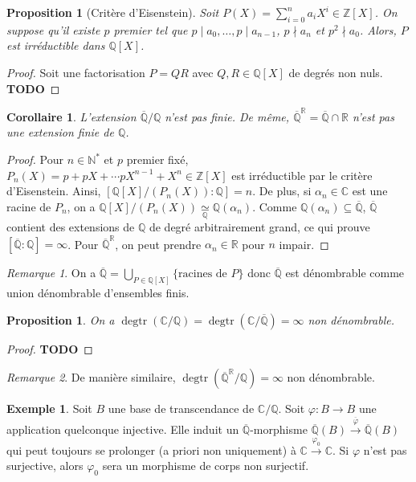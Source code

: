 \documentclass{article}
\newcommand{\N}{\mathbb{N}}
\newcommand{\Z}{\mathbb{Z}}
\newcommand{\Q}{\mathbb{Q}}
\newcommand{\Qbar}{\overline{\mathbb{Q}}}
\newcommand{\R}{\mathbb{R}}
\newcommand{\C}{\mathbb{C}}
\DeclareMathOperator{\degtr}{degtr}
\newcommand{\todo}{\textbf{TODO}}
\theoremstyle{plain}
\newtheorem{proposition}[theorem]{Proposition}
\newtheorem{corollary}[theorem]{Corollaire}
\theoremstyle{definition}
\newtheorem{example}[theorem]{Exemple}
\theoremstyle{remark}
\newtheorem*{remark}{Remarque}
\begin{document}
\begin{proposition}[Critère d'Eisenstein]
    Soit $P(X) = \sum\limits_{i=0}^n a_i X^i \in \Z[X]$. On suppose qu'il existe $p$ premier tel que $p \mid a_0,\dots,p\mid a_{n-1}$, $p \nmid a_n$ et $p^2 \nmid a_0$. Alors, $P$ est irréductible dans $\Q[X]$.
\end{proposition}

\begin{proof}
    Soit une factorisation $P = QR$ avec $Q,R \in \Q[X]$ de degrés non nuls. \todo
\end{proof}

\begin{corollary}
    L'extension $\overline{\Q}/\Q$ n'est pas finie. De même, $\overline{\Q}^\R = \overline{\Q} \cap \R$ n'est pas une extension finie de $\Q$.
\end{corollary}

\begin{proof}
    Pour $n \in \N^*$ et $p$ premier fixé, $P_n(X) = p + pX + \cdots pX^{n-1} + X^n \in \Z[X]$ est irréductible par le critère d'Eisenstein. Ainsi, $[\Q[X]/(P_n(X)) : \Q] = n$. De plus, si $\alpha_n \in \C$ est une racine de $P_n$, on a $\Q[X]/(P_n(X)) \underset{\Q}{\simeq} \Q(\alpha_n)$. Comme $\Q(\alpha_n) \subseteq \Qbar$, $\Qbar$ contient des extensions de $\Q$ de degré arbitrairement grand, ce qui prouve $[\Qbar : \Q] = \infty$. Pour $\Qbar^\R$, on peut prendre $\alpha_n \in \R$ pour $n$ impair.
\end{proof}

\begin{remark}
    On a $\Qbar = \bigcup_{P \in \Q[X]} \{\text{racines de } P\}$ donc $\Qbar$ est dénombrable comme union dénombrable d'ensembles finis.
\end{remark}

\begin{proposition}
    On a $\degtr(\C/\Q) = \degtr(\C/\Qbar) = \infty$ non dénombrable.
\end{proposition}

\begin{proof}
    \todo
\end{proof}

\begin{remark}
    De manière similaire, $\degtr(\Qbar^\R/\Q) = \infty$ non dénombrable.
\end{remark}

\begin{example}
    Soit $B$ une base de transcendance de $\C/\Q$. Soit $\varphi : B \to B$ une application quelconque injective. Elle induit un $\Qbar$-morphisme $\Qbar(B) \xrightarrow{\overline{\varphi}} \Qbar(B)$ qui peut toujours se prolonger (a priori non uniquement) à $\C \xrightarrow{\varphi_0} \C$. Si $\varphi$ n'est pas surjective, alors $\varphi_0$ sera un morphisme de corps non surjectif.
\end{example}
\end{document}
